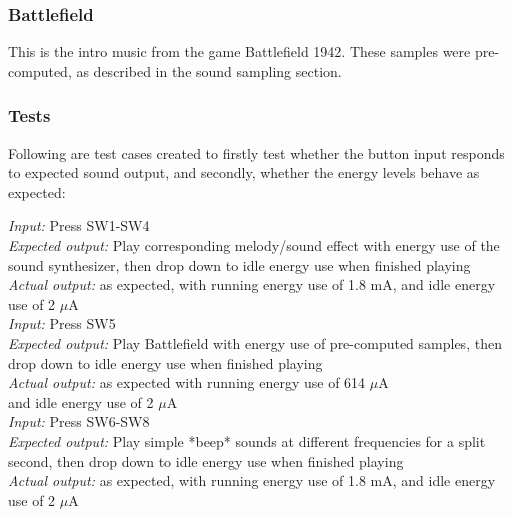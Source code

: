 \subsubsection{Battlefield}

This is the intro music from the game Battlefield 1942. These samples were pre-computed, as described in the sound sampling section. 

\subsubsection{Tests}

Following are test cases created to firstly test whether the button input responds to expected sound output, and secondly, whether the energy levels behave as expected:



\emph{Input: } Press SW1-SW4\\
\emph{Expected output: } Play corresponding melody/sound effect with energy use of the sound synthesizer, then drop down to idle energy use when finished playing\\
\emph{Actual output: } as expected, with running energy use of 1.8 mA, and idle energy use of 2 $\mu$A \\


\emph{Input: } Press SW5\\
\emph{Expected output: } Play Battlefield with energy use of pre-computed samples, then drop down to idle energy use when finished playing\\
\emph{Actual output: } as expected with running energy use of 614 $\mu$A \\ and idle energy use of 2 $\mu$A \\ 

\emph{Input: } Press SW6-SW8\\
\emph{Expected output: } Play simple *beep* sounds at different frequencies for a split second, then drop down to idle energy use when finished playing\\
\emph{Actual output: } as expected, with running energy use of 1.8 mA, and idle energy use of 2 $\mu$A \\